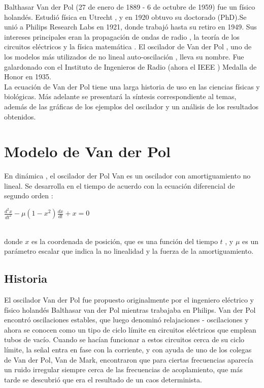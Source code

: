\documentclass[12pt]{article}
\begin{document}
Balthasar Van der Pol (27 de enero de 1889 - 6 de octubre de 1959) fue un físico holandés. Estudió física en Utrecht , y en 1920 obtuvo su doctorado (PhD).Se unió a Philips Research Labs en 1921, donde trabajó hasta su retiro en 1949. Sus intereses principales eran la propagación de ondas de radio , la teoría de los circuitos eléctricos y la física matemática . El oscilador de Van der Pol , uno de los modelos más utilizados de no lineal auto-oscilación , lleva su nombre. Fue galardonado con el Instituto de Ingenieros de Radio (ahora el IEEE ) Medalla de Honor en 1935. \\

La ecuación de Van der Pol tiene una larga historia de uso en las ciencias físicas y biológicas. Más adelante se presentará la síntesis correspondiente al temas, además de las gráficas de los ejemplos del oscilador y un análisis de los resultados obtenidos. 

\section*{Modelo de Van der Pol}
En dinámica , el oscilador der Pol Van es un oscilador con amortiguamiento no lineal. Se desarrolla en el tiempo de acuerdo con la ecuación diferencial de segundo orden :\\

\centerline{$\displaystyle \frac{d^2x}{dt^2} - \mu (1-x^2) \frac{dx}{dt} +x = 0$}
$ $\\
donde $x$ es la coordenada de posición, que es una función del tiempo $t$ , y $\mu$ es un parámetro escalar que indica la no linealidad y la fuerza de la amortiguamiento.

\subsection*{Historia}
El oscilador Van der Pol fue propuesto originalmente por el ingeniero eléctrico y físico holandés Balthasar van der Pol mientras trabajaba en Philips. Van der Pol encontró oscilaciones estables, que luego denominó relajaciones - oscilaciones y ahora se conocen como un tipo de ciclo límite en circuitos eléctricos que emplean tubos de vacío. Cuando se hacían funcionar a estos circuitos cerca de su ciclo límite, la señal entra en fase con la corriente, y con ayuda de uno de los colegas de Van der Pol, Van de Mark, encontraron que para ciertas frecuencias aparecía un ruido irregular siempre cerca de las frecuencias de acoplamiento, que más tarde se descubrió que era el resultado de un caos determinista. \\
\end{document}
